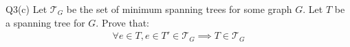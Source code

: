 \begin{problem}
  {Q3(c)}
  Let $\mathcal{T}_G$ be the set of minimum spanning trees for some graph $G$. Let $T$ be a spanning tree for $G$. Prove that:
  \begin{align*}
    \forall e \in T, e \in T' \in \mathcal{T}_G \implies T \in \mathcal{T}_G
  \end{align*}
\end{problem}

